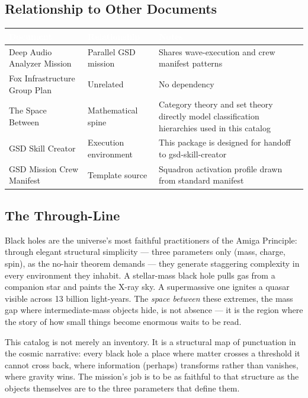\documentclass[11pt,letterpaper]{article}
\newcommand{\tableheader}[1]{\textbf{\sffamily\textcolor{white}{#1}}}
\begin{document}
\subsection{Relationship to Other Documents}

\begin{center}
\begin{tabularx}{\textwidth}{L{4cm}L{4cm}X}
\toprule
{}
\tableheader{Document} & \tableheader{Relationship} & \tableheader{Notes} \\
\midrule
Deep Audio Analyzer Mission & Parallel GSD mission & Shares wave-execution and crew manifest patterns \\
Fox Infrastructure Group Plan & Unrelated & No dependency \\
The Space Between & Mathematical spine & Category theory and set theory directly model classification hierarchies used in this catalog \\
GSD Skill Creator & Execution environment & This package is designed for handoff to gsd-skill-creator \\
GSD Mission Crew Manifest & Template source & Squadron activation profile drawn from standard manifest \\
\bottomrule
\end{tabularx}
\end{center}

\subsection{The Through-Line}

Black holes are the universe's most faithful practitioners of the Amiga Principle: through elegant structural simplicity --- three parameters only (mass, charge, spin), as the no-hair theorem demands --- they generate staggering complexity in every environment they inhabit. A stellar-mass black hole pulls gas from a companion star and paints the X-ray sky. A supermassive one ignites a quasar visible across 13 billion light-years. The \textit{space between} these extremes, the mass gap where intermediate-mass objects hide, is not absence --- it is the region where the story of how small things become enormous waits to be read.

This catalog is not merely an inventory. It is a structural map of punctuation in the cosmic narrative: every black hole a place where matter crosses a threshold it cannot cross back, where information (perhaps) transforms rather than vanishes, where gravity wins. The mission's job is to be as faithful to that structure as the objects themselves are to the three parameters that define them.
\end{document}
